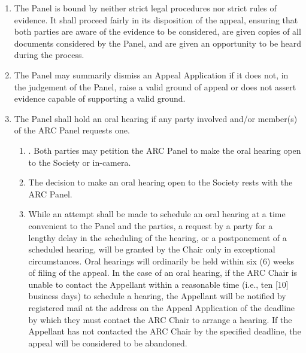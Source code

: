 \begin{enumerate} [align=left]
\begin{enumerate} [label*=\arabic*., align=left]
\begin{enumerate} [label*=\arabic*., align=left]
\item Constitute a Panel of at least three (3) members including the chairperson. If the chairperson recuses themself from the proceedings, the panel must elect an interim chairperson from within their ranks.
\item Member(s) from the same department as either of the parties shall recuse themselves from the panel.
\item Facilitate the scheduling of the initial meeting of the Panel.
\end{enumerate}
\item The Panel is bound by neither strict legal procedures nor strict rules of evidence. It shall proceed fairly in its disposition of the appeal, ensuring that both parties are aware of the evidence to be considered, are given copies of all documents considered by the Panel, and are given an opportunity to be heard during the process.
\item The Panel may summarily dismiss an Appeal Application if it does not, in the judgement of the Panel, raise a valid ground of appeal or does not assert evidence capable of supporting a valid ground.
\item The Panel shall hold an oral hearing if any party involved and/or member(s) of the ARC Panel requests one.
\begin{enumerate} [label*=\arabic*., align=left]
\item. Both parties may petition the ARC Panel to make the oral hearing open to the Society or in-camera.
\item The decision to make an oral hearing open to the Society rests with the ARC Panel.
\item While an attempt shall be made to schedule an oral hearing at a time convenient to the Panel and the parties, a request by a party for a lengthy delay in the scheduling of the hearing, or a postponement of a scheduled hearing, will be granted by the Chair only in exceptional circumstances. Oral hearings will ordinarily be held within six (6) weeks of filing of the appeal. In the case of an oral hearing, if the ARC Chair is unable to contact the Appellant within a reasonable time (i.e., ten [10] business days) to schedule a hearing, the Appellant will be notified by registered mail at the address on the Appeal Application of the deadline by which they must contact the ARC Chair to arrange a hearing. If the Appellant has not contacted the ARC Chair by the specified deadline, the appeal will be considered to be abandoned. 

\end{enumerate}
\end{enumerate}
\end{enumerate}
